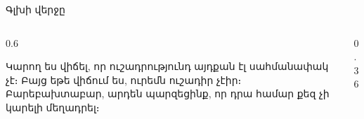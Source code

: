 \begin{frame}{Գլխի վերջը}
  \begin{columns}[c]
    \begin{column}{0.6\textwidth}
      \begin{bookquote}
        Կարող ես վիճել, որ ուշադրությունդ այդքան էլ սահմանափակ չէ։ Բայց եթե վիճում ես, ուրեմն ուշադիր չէիր։ Բարեբախտաբար, արդեն պարզեցինք, որ դրա համար քեզ չի կարելի մեղադրել։
      \end{bookquote}
    \end{column}
    \begin{column}{0.36\textwidth}
      \centering
    \end{column}
  \end{columns}
\end{frame}

